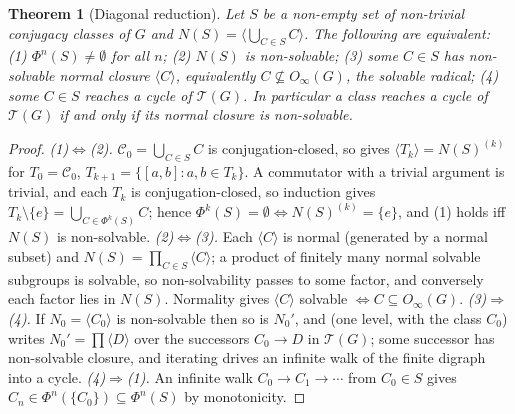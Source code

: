 \documentclass[11pt]{amsart}
\newtheorem{theorem}{Theorem}[section]
\theoremstyle{definition}
\theoremstyle{remark}
\theoremstyle{plain}
\theoremstyle{plain}
\numberwithin{equation}{section}
\begin{document}
\begin{theorem}[Diagonal reduction]
\label{thm:diagred}
Let $S$ be a non-empty set of non-trivial conjugacy classes of $G$ and
$N(S)=\langle\bigcup_{C\in S}C\rangle$. The following are equivalent:
\textup{(1)} $\Phi^n(S)\neq\emptyset$ for all $n$;
\textup{(2)} $N(S)$ is non-solvable;
\textup{(3)} some $C\in S$ has non-solvable normal closure $\langle C\rangle$, equivalently
$C\not\subseteq O_\infty(G)$, the solvable radical;
\textup{(4)} some $C\in S$ reaches a cycle of $\mathcal{T}(G)$.
In particular a class reaches a cycle of $\mathcal{T}(G)$ if and only if its normal closure is
non-solvable.
\end{theorem}
\begin{proof}
\emph{(1)$\Leftrightarrow$(2).} $\mathcal{C}_0=\bigcup_{C\in S}C$ is conjugation-closed, so
 gives $\langle T_k\rangle=N(S)^{(k)}$ for $T_0=\mathcal{C}_0$,
$T_{k+1}=\{[a,b]:a,b\in T_k\}$. A commutator with a trivial argument is trivial, and each $T_k$
is conjugation-closed, so induction gives $T_k\setminus\{e\}=\bigcup_{C\in\Phi^k(S)}C$; hence
$\Phi^k(S)=\emptyset\iff N(S)^{(k)}=\{e\}$, and (1) holds iff $N(S)$ is non-solvable.
\emph{(2)$\Leftrightarrow$(3).} Each $\langle C\rangle$ is normal (generated by a normal
subset) and $N(S)=\prod_{C\in S}\langle C\rangle$; a product of finitely many normal solvable
subgroups is solvable, so non-solvability passes to some factor, and conversely each factor
lies in $N(S)$. Normality gives $\langle C\rangle$ solvable $\iff C\subseteq O_\infty(G)$.
\emph{(3)$\Rightarrow$(4).} If $N_0=\langle C_0\rangle$ is non-solvable then so is $N_0'$, and
 (one level, with the class $C_0$) writes $N_0'=\prod\langle D\rangle$ over
the successors $C_0\to D$ in $\mathcal{T}(G)$; some successor has non-solvable closure, and
iterating drives an infinite walk of the finite digraph into a cycle.
\emph{(4)$\Rightarrow$(1).} An infinite walk $C_0\to C_1\to\cdots$ from $C_0\in S$ gives
$C_n\in\Phi^n(\{C_0\})\subseteq\Phi^n(S)$ by monotonicity.
\end{proof}
\end{document}
